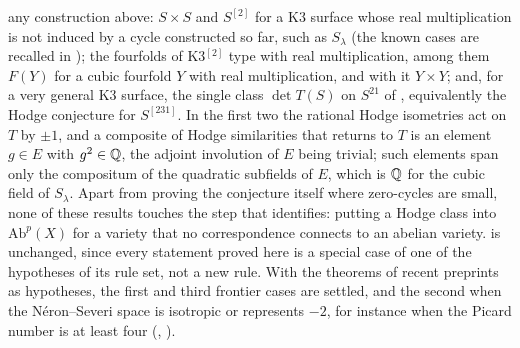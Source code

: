 \begin{remark}
any construction above: $S\times S$ and $S^{[2]}$ for a K3 surface
whose real multiplication is not induced by a cycle constructed so far, such
as $S_{\lambda}$
(the known cases are recalled in ); the fourfolds of
K3$^{[2]}$ type with real multiplication, among them $F(Y)$ for a cubic
fourfold $Y$ with real multiplication, and with it $Y\times Y$; and, for a
very general K3 surface, the single class $\det T(S)$ on $S^{21}$ of
, equivalently the Hodge conjecture for $S^{[231]}$.
In the first two the
rational Hodge isometries \cite{Bus19,Mar24} act on $T$ by $\pm1$, and a
composite of Hodge similarities that returns to $T$ is an element $g\in E$
with $g^{2}\in\mathbb{Q}$, the adjoint involution of $E$ being trivial; such
elements span only the compositum of the quadratic subfields of $E$, which is
$\mathbb{Q}$ for the cubic field of $S_{\lambda}$. Apart from proving the
conjecture itself where zero-cycles are small, none of these results touches
the step that
 identifies: putting a Hodge class into
$\mathrm{Ab}^{p}(X)$ for a variety that no correspondence connects to an
abelian variety.  is unchanged, since every statement
proved here is a special case of one of the hypotheses of its rule set, not a
new rule. With the theorems of recent preprints as hypotheses, the first and
third frontier cases are settled, and the second when the N\'eron--Severi
space is isotropic or represents $-2$, for instance when the Picard number is
at least four (, ).
\end{remark}


